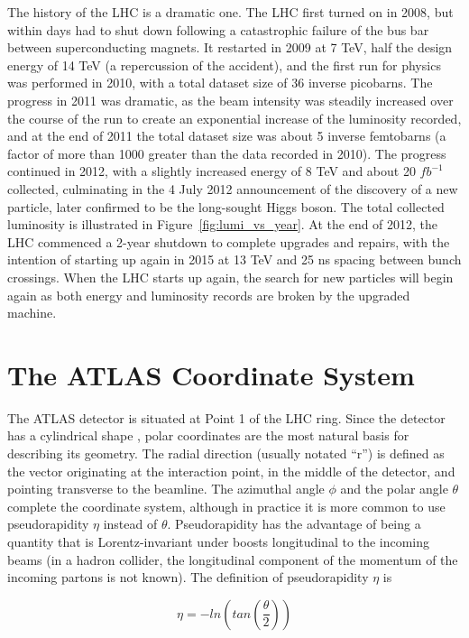 The history of the LHC is a dramatic one.  The LHC first turned on in 2008, but within 
days had to shut down following a catastrophic failure of the bus bar between superconducting magnets.  It restarted in 
2009 at 7 TeV, half the design energy of 14 TeV (a repercussion of the accident), and 
the first run for physics was performed in 2010, with a total dataset size of 36 inverse picobarns.  
The progress in 2011 was dramatic, as the beam intensity was steadily increased over the course of the run 
to create an exponential increase of the luminosity recorded, and at the end of 2011 the total dataset size 
was about 5 inverse femtobarns (a factor of more than 1000 greater than the data recorded in 2010).  
The progress continued in 2012, with a slightly increased energy of 8 TeV and about 20 $fb^{-1}$ 
collected, culminating in the 4 July 2012 announcement of the discovery of a new particle, later confirmed to 
be the long-sought Higgs boson.  The total collected luminosity is illustrated in Figure~\ref{fig:lumi_vs_year}.  
At the end of 2012, the LHC commenced a 2-year shutdown to complete upgrades and repairs, 
with the intention of starting up again in 2015 at 13 TeV and 25 ns spacing between bunch crossings.
When the LHC starts up again, the search for new particles will begin again as both energy and luminosity
records are broken by the upgraded machine.



\section{The ATLAS Coordinate System}
The ATLAS detector is situated at Point 1 of the LHC ring.  Since the detector has a cylindrical shape
, polar coordinates are the most natural basis for describing its geometry.  The radial direction (usually notated ``r'') 
is defined as the vector originating at the interaction point, in the middle of the detector, and pointing 
transverse to the beamline.  The azimuthal angle $\phi$ and the polar angle $\theta$ complete the 
coordinate system, although in practice it is more common to use pseudorapidity $\eta$ instead of $\theta$.  
Pseudorapidity has the advantage of being a quantity that is Lorentz-invariant under boosts longitudinal to the incoming beams 
(in a hadron collider, the longitudinal component of the momentum of the incoming partons is not known).  
The definition of pseudorapidity $\eta$ is

\begin{equation}
\eta = -ln(tan( \frac{\theta}{2} ))
\end{equation}


